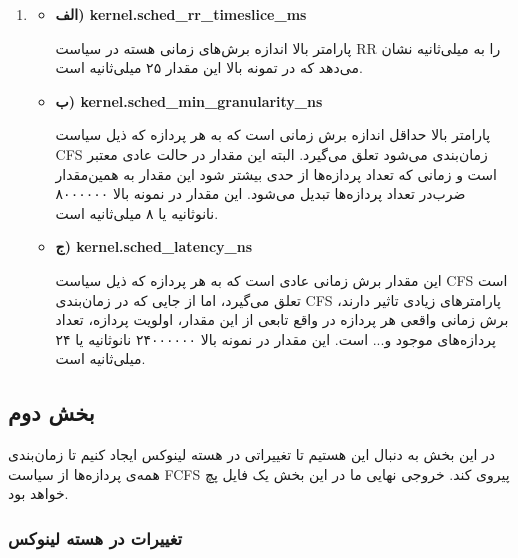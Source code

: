 \documentclass{article}
\begin{document}
\begin{enumerate}
\item \begin{itemize}

\item \textbf{الف) kernel.sched\_rr\_timeslice\_ms}

پارامتر بالا اندازه برش‌های زمانی هسته در سیاست RR را به میلی‌ثانیه نشان می‌دهد که در تمونه بالا این مقدار ۲۵ میلی‌ثانیه است.

\item \textbf{ب) kernel.sched\_min\_granularity\_ns}

پارامتر بالا حداقل اندازه برش زمانی است که به هر پردازه که ذیل سیاست CFS زمان‌بندی می‌شود تعلق می‌گیرد. البته این مقدار در حالت عادی معتبر است و زمانی که تعداد پردازه‌ها از حدی بیشتر شود این مقدار به همین‌مقدار ضرب‌در تعداد پردازه‌ها تبدیل می‌شود. این مقدار در نمونه بالا ۸۰۰۰۰۰۰ نانو‌ثانیه یا ۸ میلی‌ثانیه است.

\item \textbf{ج) kernel.sched\_latency\_ns}

این مقدار برش زمانی عادی است که به هر پردازه که ذیل سیاست CFS است تعلق می‌گیرد، اما از جایی که در زمان‌بندی CFS پارامتر‌های زیادی تاثیر دارند،‌ برش زمانی واقعی هر پردازه در واقع تابعی از این مقدار، اولویت پردازه، تعداد پردازه‌های موجود و... است. این مقدار در نمونه بالا ۲۴۰۰۰۰۰۰ نانو‌ثانیه یا ۲۴ میلی‌ثانیه است.

\end{itemize}

\end{enumerate}

\subsection{بخش دوم}

در این بخش به دنبال این هستیم تا تغییراتی در هسته لینوکس ایجاد کنیم تا زمان‌بندی همه‌ی پردازه‌ها از سیاست FCFS پیروی کند. خروجی نهایی ما در این بخش یک فایل پچ خواهد بود.

\subsubsection{تغییرات در هسته لینوکس\cite{5}}
\end{document}
